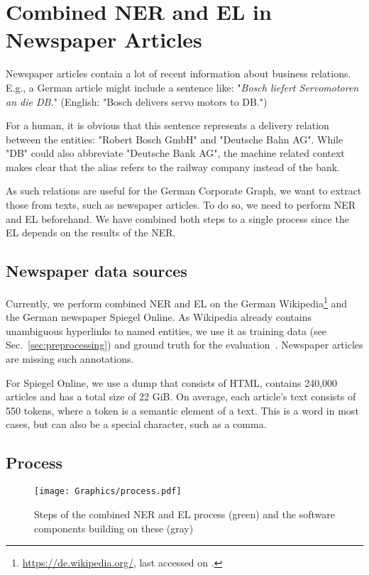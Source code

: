 \section{Combined NER and EL in Newspaper Articles}
\label{sec:ner_el}
Newspaper articles contain a lot of recent information about business relations. E.g., a German article might include a sentence like: "\textit{Bosch liefert Servomotoren an die DB.}" (English: "Bosch delivers servo motors to DB.")

For a human, it is obvious that this sentence represents a delivery relation between the entities: "Robert Bosch GmbH" and "Deutsche Bahn AG". While "DB" could also abbreviate "Deutsche Bank AG", the machine related context makes clear that the alias refers to the railway company instead of the bank.

As such relations are useful for the German Corporate Graph, we want to extract those from texts, such as newspaper articles. To do so, we need to perform NER and EL beforehand. We have combined both steps to a single process since the EL depends on the results of the NER.



\subsection{Newspaper data sources}
Currently, we perform combined NER and EL on the German Wikipedia\footnote{\url{https://de.wikipedia.org/}, last accessed on .} and the German newspaper Spiegel Online\footnotemark{}. As Wikipedia already contains unambiguous hyperlinks to named entities, we use it as training data (see Sec.~\ref{sec:preprocessing}) and ground truth for the evaluation~\cite{ehmueller}. Newspaper articles are missing such annotations.

For Spiegel Online, we use a dump that consists of HTML, contains 240,000\footnotemark{} articles and has a total size of 22 GiB. On average, each article's text consists of 550 tokens, where a token is a semantic element of a text. This is a word in most cases, but can also be a special character, such as a comma.



\subsection{Process}
\begin{figure}[ht]
	\centering
  \texttt{[image: Graphics/process.pdf]}
	\caption{Steps of the combined NER and EL process (green) and the software components building on these (gray)}
	\label{fig:ner_el_process}
\end{figure}

